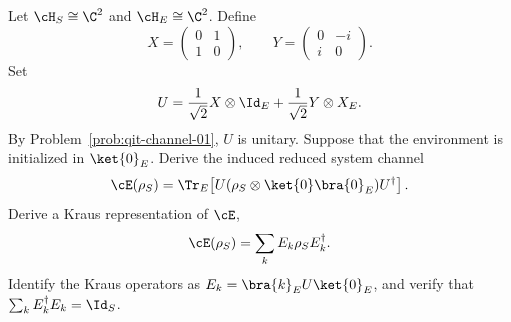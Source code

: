 Let $\cH_S\cong\C^2$ and $\cH_E\cong\C^2$. Define
$$
X=
\begin{pmatrix}
0&1\\
1&0
\end{pmatrix},
\qquad
Y=
\begin{pmatrix}
0&-i\\
i&0
\end{pmatrix}.
$$
Set
$$
U=
\frac{1}{\sqrt{2}}X\otimes\Id_E
+
\frac{1}{\sqrt{2}}Y\otimes X_E.
$$
By Problem~\ref{prob:qit-channel-01}, $U$ is unitary. Suppose that the environment is initialized in $\ket{0}_E$. Derive the induced reduced system channel
$$
\cE(\rho_S)
=
\Tr_E\!\left[
U(\rho_S\otimes\ket{0}\bra{0}_E)U^\dagger
\right].
$$
Derive a Kraus representation of $\cE$,
$$
\cE(\rho_S)=\sum_k E_k\rho_S E_k^\dagger.
$$
Identify the Kraus operators as $E_k=\bra{k}_E U\ket{0}_E$, and verify that $\sum_k E_k^\dagger E_k=\Id_S$.
